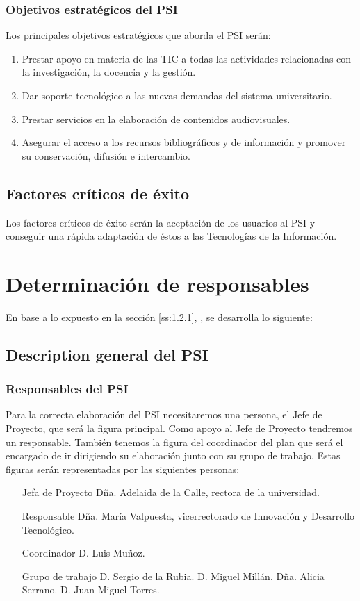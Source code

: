 \documentclass[11pt,a4paper,spanish,twoside]{book}
\begin{document}
\subsubsection{Objetivos estratégicos del PSI}
Los principales objetivos estratégicos que aborda el PSI serán:
\begin{enumerate}
\item Prestar apoyo en materia de las TIC a todas las actividades relacionadas
con la investigación, la docencia y la gestión.
\item Dar soporte tecnológico a las nuevas demandas del sistema universitario.
\item Prestar servicios en la elaboración de contenidos audiovisuales.
\item Asegurar el acceso a los recursos bibliográficos y de información y 
promover su conservación, difusión e intercambio.
\end{enumerate}

\subsection{Factores críticos de éxito}
Los factores críticos de éxito serán la aceptación de
los usuarios al PSI y conseguir una rápida adaptación de éstos a las
Tecnologías de la Información.

\section{Determinación de responsables}
En base a lo expuesto en la sección \vref{ss:1.2.1}, \emph{},
se desarrolla lo siguiente:

\subsection{Description general del PSI}\label{ss:1.3.1}
\subsubsection{Responsables del PSI}
Para la correcta elaboración del PSI necesitaremos una persona, el Jefe de 
Proyecto, que será la figura principal. Como apoyo al Jefe de Proyecto 
tendremos un responsable. También tenemos la figura del coordinador del plan 
que será el encargado de ir dirigiendo su elaboración junto con su grupo de 
trabajo. Estas figuras serán representadas por las siguientes personas:
\begin{itemize}
\item[Jefa de Proyecto]
Dña. Adelaida de la Calle, rectora de la universidad.
\item[Responsable]
Dña. María Valpuesta, vicerrectorado de Innovación y Desarrollo Tecnológico.
\item[Coordinador]
D. Luis Muñoz.
\item[Grupo de trabajo]
D. Sergio de la Rubia.
D. Miguel Millán.
Dña. Alicia Serrano.
D. Juan Miguel Torres.
\end{itemize}
\end{document}
